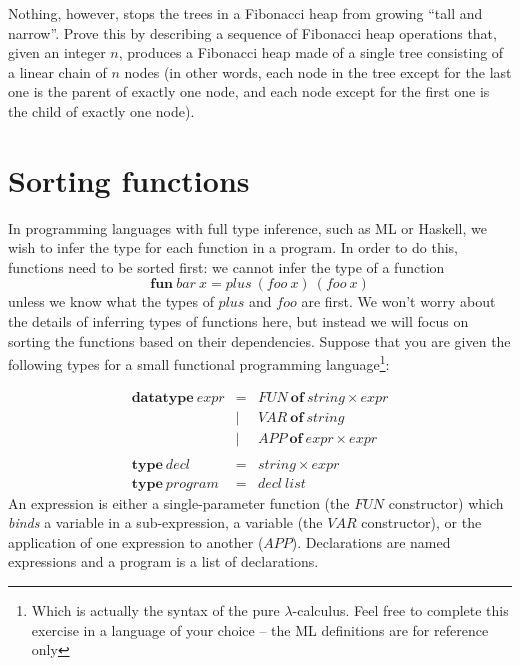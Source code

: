 \documentclass[10pt,a4paper]{exam}
\begin{document}
\begin{questions}
\question[10] Nothing, however, stops the trees in a Fibonacci heap from growing ``tall and narrow''. Prove this by describing a sequence of Fibonacci heap operations that, given an integer $n$, produces a Fibonacci heap made of a single tree consisting of a linear chain of $n$ nodes (in other words, each node in the tree except for the last one is the parent of exactly one node, and each node except for the first one is the child of exactly one node). \droppoints 

\section{Sorting functions}

\question[4] In programming languages with full type inference, such as ML or Haskell, we wish to infer the type for each function in a program. In order to do this, functions need to be sorted first: we cannot infer the type of a function
\begin{displaymath}
\mathbf{fun}~\mathit{bar}~x = \mathit{plus}~(\mathit{foo}~x)~(\mathit{foo}~x)
\end{displaymath}
unless we know what the types of $\mathit{plus}$ and $\mathit{foo}$ are first. We won't worry about the details of inferring types of functions here, but instead we will focus on sorting the functions based on their dependencies. Suppose that you are given the following types for a small functional programming language\footnote{Which is actually the syntax of the pure $\lambda$-calculus. Feel free to complete this exercise in a language of your choice -- the ML definitions are for reference only}:

\begin{displaymath}
\begin{array}{lcl}
\mathbf{datatype}~\mathit{expr} & = & \mathit{FUN}~\mathbf{of}~\mathit{string} \times \mathit{expr} \\
                                & \mid & \mathit{VAR}~\mathbf{of}~\mathit{string} \\
                                & \mid & \mathit{APP}~\mathbf{of}~\mathit{expr} \times \mathit{expr} \\\\
\mathbf{type}~\mathit{decl} & = & \mathit{string} \times \mathit{expr} \\
\mathbf{type}~\mathit{program} & = & \mathit{decl}~\mathit{list}
\end{array}
\end{displaymath}
An expression is either a single-parameter function (the $\mathit{FUN}$ constructor) which \emph{binds} a variable in a sub-expression, a variable (the $\mathit{VAR}$ constructor), or the application of one expression to another ($\mathit{APP}$). Declarations are named expressions and a program is a list of declarations.


\end{questions}
\end{document}
